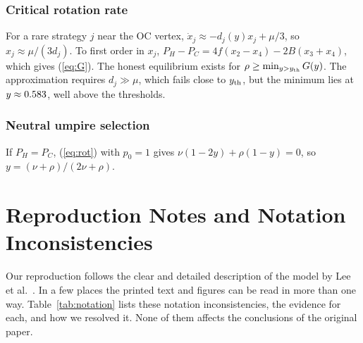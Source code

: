 \documentclass[journal]{IEEEtran}
\begin{document}
\subsubsection{Critical rotation rate} For a rare strategy $j$ near the OC vertex,
$\dot x_j\approx -d_j(y)x_j+\mu/3$, so $x_j\approx\mu/(3d_j)$. To first order in $x_j$,
$P_H-P_C=4f(x_2-x_4)-2B(x_3+x_4)$, which gives (\ref{eq:G}). The honest equilibrium exists for
$\rho\ge\min_{y>y_{\rm th}}G(y)$. The approximation requires $d_j\gg\mu$, which fails close to
$y_{\rm th}$, but the minimum lies at $y\approx0.583$, well above the thresholds.

\subsubsection{Neutral umpire selection} If $P_H=P_C$, (\ref{eq:rot}) with $p_0=1$ gives
$\nu(1-2y)+\rho(1-y)=0$, so $y=(\nu+\rho)/(2\nu+\rho)$.

\section{Reproduction Notes and Notation Inconsistencies}\label{app:notes}

Our reproduction follows the clear and detailed description of the model by Lee et
al.~\cite{lee2019social}. In a few places the printed text and figures can be read in more than
one way. Table~\ref{tab:notation} lists these notation inconsistencies, the evidence for each, and
how we resolved it. None of them affects the conclusions of the original paper.
\end{document}
